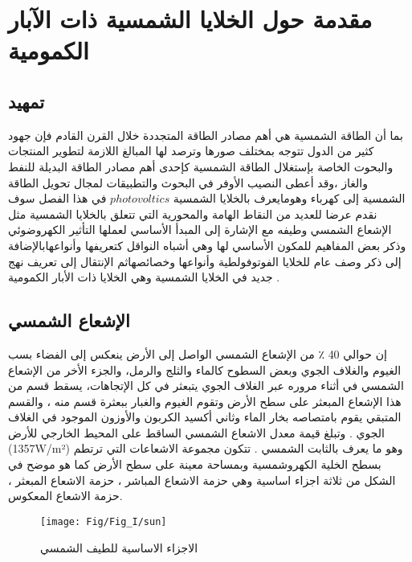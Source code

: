 \chapter{مقدمة حول الخلايا الشمسية ذات الآبار الكمومية}

\label{Chapter1}


\section {تمهيد }  
بما أن الطاقة الشمسية هي أهم مصادر الطاقة المتجددة خلال القرن القادم فإن جهود كثير من الدول تتوجه بمختلف صورها وترصد لها المبالغ اللازمة لتطوير المنتجات والبحوت الخاصة بإستغلال الطاقة الشمسية كإحدى أهم مصادر الطاقة البديلة للنفط والغاز ،وقد أعطى النصيب الأوفر في البحوث والتطبيقات لمجال تحويل الطاقة الشمسية إلى كهرباء وهومايعرف بالخلايا الشمسية  $ photovoltics   $             
في هذا الفصل سوف نقدم عرضا للعديد من النقاط الهامة والمحورية التي تتعلق بالخلايا الشمسية مثل الإشعاع الشمسي  وطيفه مع الإشارة إلى المبدأ الأساسي لعملها التأثير الكهروضوئي وذكر بعض المفاهيم للمكون الأساسي لها وهي أشباه النواقل كتعريفها وأنواعهابالإضافة إلى ذكر وصف عام للخلايا الفوتوفولطية وأنواعها وخصائصهاثم الإنتقال إلى تعريف نهج جديد في الخلايا الشمسية وهي الخلايا ذات الأبار الكمومية   .
\section {الإشعاع الشمسي  }
إن حوالي 40 ٪ من الإشعاع الشمسي الواصل إلى الأرض ينعكس إلى الفضاء بسب الغيوم والغلاف الجوي وبعض السطوح كالماء والثلج والرمل، والجزء الأخر من الإشعاع الشمسي في أثناء مروره عبر الغلاف الجوي يتبعثر في كل الإتجاهات، يسقط قسم من هذا الإشعاع المبعثر على سطح الأرض وتقوم الغيوم والغبار ببعثرة قسم منه ، والقسم المتبقي يقوم بامتصاصه بخار الماء وثاني أكسيد الكربون والأوزون الموجود في الغلاف الجوي . وتبلغ قيمة معدل الاشعاع الشمسي الساقط على المحيط الخارجي للأرض (1357W/m²) وهو ما يعرف بالثابت الشمسي .
تتكون مجموعة الاشعاعات التي ترتطم بسطح الخلية الكهروشمسية وبمساحة معينة على سطح الأرض كما هو موضح في الشكل من ثلاثة اجزاء اساسية وهي حزمة الاشعاع المباشر ، حزمة الاشعاع المبعثر ، حزمة الاشعاع المعكوس. \cite{a1}   

\begin{figure}[h!]
	\centering
	\texttt{[image: Fig/Fig\_I/sun]}
	\caption{الاجزاء الاساسية للطيف الشمسي}
	\label{fig:sun}
\end{figure}
\FloatBarrier

